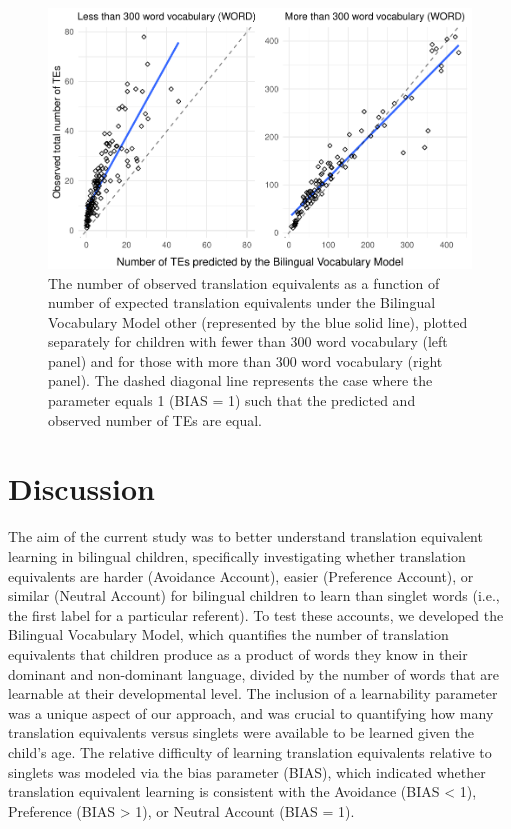 \documentclass[
  english,
  ,man,floatsintext]{apa6}
\begin{document}
\begin{figure}

{\centering \includegraphics[width=1.2\linewidth]{paper_TE_bilingual_vocabulary_model_files/figure-latex/fig7-1} 

}

\caption{The number of observed translation equivalents as a function of number of expected translation equivalents under the Bilingual Vocabulary Model other (represented by the blue solid line), plotted separately for children with fewer than 300 word vocabulary (left panel) and for those with more than 300 word vocabulary (right panel). The dashed diagonal line represents the case where the parameter equals 1 (BIAS = 1) such that the predicted and observed number of TEs are equal.}\label{fig:fig7}
\end{figure}

\hypertarget{discussion}{%
\section{Discussion}\label{discussion}}

The aim of the current study was to better understand translation equivalent learning in bilingual children, specifically investigating whether translation equivalents are harder (Avoidance Account), easier (Preference Account), or similar (Neutral Account) for bilingual children to learn than singlet words (i.e., the first label for a particular referent). To test these accounts, we developed the Bilingual Vocabulary Model, which quantifies the number of translation equivalents that children produce as a product of words they know in their dominant and non-dominant language, divided by the number of words that are learnable at their developmental level. The inclusion of a learnability parameter was a unique aspect of our approach, and was crucial to quantifying how many translation equivalents versus singlets were available to be learned given the child's age. The relative difficulty of learning translation equivalents relative to singlets was modeled via the bias parameter (BIAS), which indicated whether translation equivalent learning is consistent with the Avoidance (BIAS \textless{} 1), Preference (BIAS \textgreater{} 1), or Neutral Account (BIAS = 1).
\end{document}
